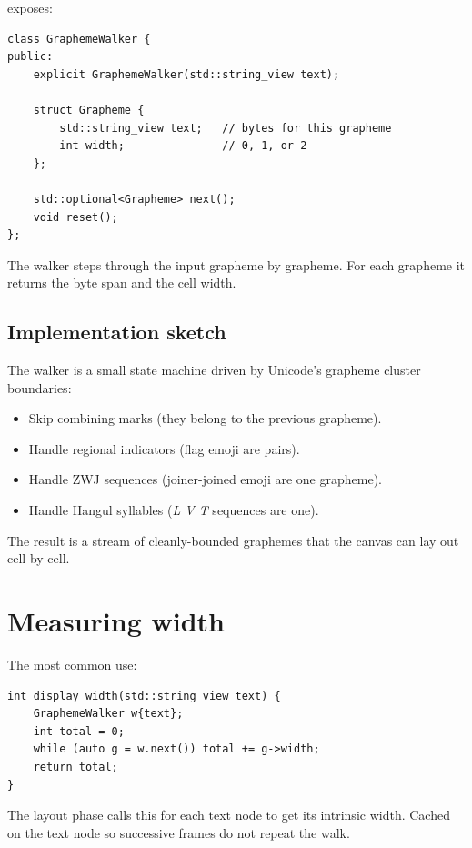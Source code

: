  exposes:

\begin{lstlisting}
class GraphemeWalker {
public:
    explicit GraphemeWalker(std::string_view text);

    struct Grapheme {
        std::string_view text;   // bytes for this grapheme
        int width;               // 0, 1, or 2
    };

    std::optional<Grapheme> next();
    void reset();
};
\end{lstlisting}

The walker steps through the input grapheme by grapheme. For
each grapheme it returns the byte span and the cell width.

\subsection*{Implementation sketch}

The walker is a small state machine driven by Unicode's grapheme
cluster boundaries:

\begin{itemize}[leftmargin=*]
  \item Skip combining marks (they belong to the previous
    grapheme).
  \item Handle regional indicators (flag emoji are pairs).
  \item Handle ZWJ sequences (joiner-joined emoji are one
    grapheme).
  \item Handle Hangul syllables (\emph{L V T} sequences are one).
\end{itemize}

The result is a stream of cleanly-bounded graphemes that the
canvas can lay out cell by cell.

\section{Measuring width}

The most common use:

\begin{lstlisting}
int display_width(std::string_view text) {
    GraphemeWalker w{text};
    int total = 0;
    while (auto g = w.next()) total += g->width;
    return total;
}
\end{lstlisting}

The layout phase calls this for each text node to get its
intrinsic width. Cached on the text node so successive frames do
not repeat the walk.

